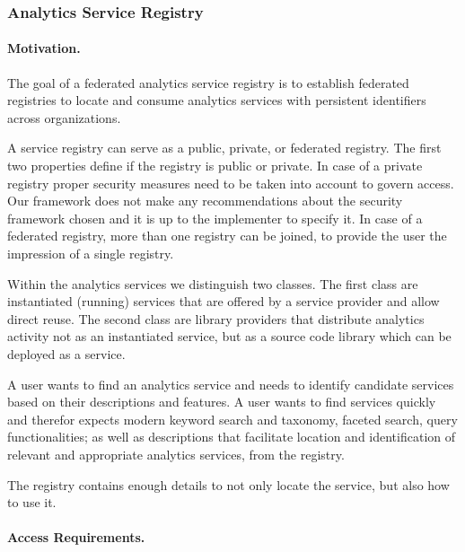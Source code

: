 
\subsubsection{Analytics Service Registry}
\label{sec:registry}

\paragraph*{Motivation.} 

The goal of a federated analytics service registry is to establish
federated registries to locate and consume analytics services with
persistent identifiers across organizations.

A service registry can serve as a public, private, or federated
registry. The first two properties define if the registry is public or
private. In case of a private registry proper security measures need
to be taken into account to govern access. Our framework does not make
any recommendations about the security framework chosen and it is up
to the implementer to specify it. In case of a federated registry,
more than one registry can be joined, to provide the user the
impression of a single registry.

Within the analytics services we distinguish two classes. The first
class are instantiated (running) services that are offered by a
service provider and allow direct reuse. The second class are library
providers that distribute analytics activity not as an instantiated
service, but as a source code library which can be deployed as a
service.


 A user wants to find an analytics service and needs to
identify candidate services based on their descriptions and
features. A user wants to find services quickly and therefor expects
modern keyword search and taxonomy, faceted search, query
functionalities; as well as descriptions that facilitate location and
identification of relevant and appropriate analytics services, from the
registry.

The registry contains enough details to not only locate the service,
but also how to use it.

\paragraph*{Access Requirements.} 


